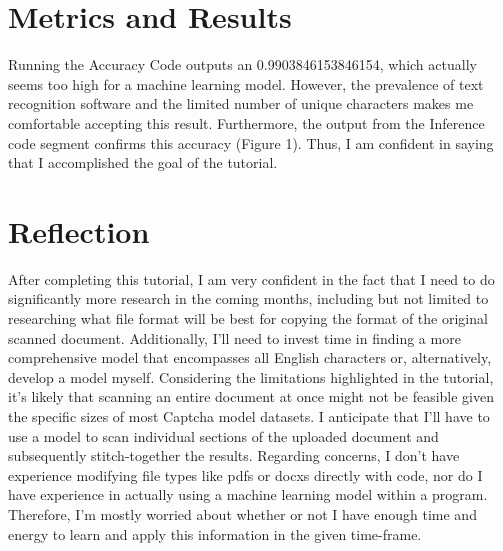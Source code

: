 \documentclass[10pt,twocolumn]{article}
\begin{document}
\section{Metrics and Results}
Running the Accuracy Code outputs an 0.9903846153846154, which actually seems too high for a machine learning model. However, the prevalence of text recognition software and the limited number of unique characters makes me comfortable accepting this result. Furthermore, the output from the Inference code segment confirms this accuracy (Figure 1). Thus, I am confident in saying that I accomplished the goal of the tutorial. 


\section{Reflection}
After completing this tutorial, I am very confident in the fact that I need to do significantly more research in the coming months, including but not limited to researching what file format will be best for copying the format of the original scanned document.  Additionally, I'll need to invest time in finding a more comprehensive model that encompasses all English characters or, alternatively, develop a model myself. Considering the limitations highlighted in the tutorial, it's likely that scanning an entire document at once might not be feasible given the specific sizes of most Captcha model datasets.  I anticipate that I'll have to use a model to scan individual sections of the uploaded document and subsequently stitch-together the results. Regarding concerns, I don't have experience modifying file types like pdfs or docxs directly with code, nor do I have experience in actually using a machine learning model within a program. Therefore, I'm mostly worried about whether or not I have enough time and energy to learn and apply this information in the given time-frame. 

\printbibliography
\end{document}
